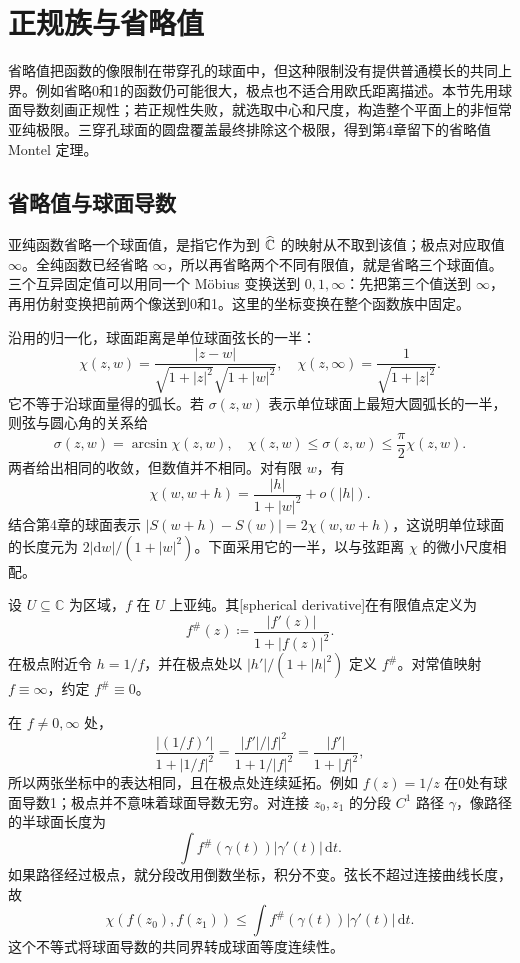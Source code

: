 \section{正规族与省略值}
\label{b3:sec:1403}

省略值把函数的像限制在带穿孔的球面中，但这种限制没有提供普通模长的共同上界。例如省略0和1的函数仍可能很大，极点也不适合用欧氏距离描述。本节先用球面导数刻画正规性；若正规性失败，就选取中心和尺度，构造整个平面上的非恒常亚纯极限。三穿孔球面的圆盘覆盖最终排除这个极限，得到第4章留下的省略值 Montel 定理。

\subsection{省略值与球面导数}
\label{b3:subsec:140301}

亚纯函数省略一个球面值，是指它作为到 \(\widehat{\mathbb C\kern0pt}\) 的映射从不取到该值；极点对应取值 \(\infty\)。全纯函数已经省略 \(\infty\)，所以再省略两个不同有限值，就是省略三个球面值。三个互异固定值可以用同一个 Möbius 变换送到 \(0,1,\infty\)：先把第三个值送到 \(\infty\)，再用仿射变换把前两个像送到0和1。这里的坐标变换在整个函数族中固定。

\ProseParagraphBreak
沿用的归一化，球面距离是单位球面弦长的一半：
\[
 \chi(z,w)=\frac{|z-w|}
 {\sqrt{1+|z|^2}\sqrt{1+|w|^2}},\quad
 \chi(z,\infty)=\frac1{\sqrt{1+|z|^2}}.
\]
它不等于沿球面量得的弧长。若 \(\sigma(z,w)\) 表示单位球面上最短大圆弧长的一半，则弦与圆心角的关系给
\[
 \sigma(z,w)=\arcsin\chi(z,w),\quad
 \chi(z,w)\le\sigma(z,w)\le\frac\pi2\chi(z,w).
\]
两者给出相同的收敛，但数值并不相同。对有限 \(w\)，有
\[
 \chi(w,w+h)=\frac{|h|}{1+|w|^2}+o(|h|).
\]
结合第4章的球面表示 \(|S(w+h)-S(w)|=2\chi(w,w+h)\)，这说明单位球面的长度元为 \(2|\mathrm dw|/(1+|w|^2)\)。下面采用它的一半，以与弦距离 \(\chi\) 的微小尺度相配。

\begin{definition}\label{b3:def:14-spherical-derivative}
设 \(U\subseteq\mathbb C\) 为区域，\(f\) 在 \(U\) 上亚纯。其[spherical derivative]在有限值点定义为
\[
 f^\#(z)\coloneqq\frac{|f'(z)|}{1+|f(z)|^2}.
\]
在极点附近令 \(h=1/f\)，并在极点处以 \(|h'|/(1+|h|^2)\) 定义 \(f^\#\)。对常值映射 \(f\equiv\infty\)，约定 \(f^\#\equiv0\)。
\end{definition}

在 \(f\ne0,\infty\) 处，
\[
 \frac{|(1/f)'|}{1+|1/f|^2}
 =\frac{|f'|/|f|^2}{1+1/|f|^2}
 =\frac{|f'|}{1+|f|^2},
\]
所以两张坐标中的表达相同，且在极点处连续延拓。例如 \(f(z)=1/z\) 在0处有球面导数1；极点并不意味着球面导数无穷。对连接 \(z_0,z_1\) 的分段 \(C^1\) 路径 \(\gamma\)，像路径的半球面长度为
\[
 \int f^\#(\gamma(t))|\gamma'(t)|\,\mathrm dt.
\]
如果路径经过极点，就分段改用倒数坐标，积分不变。弦长不超过连接曲线长度，故
\[
 \chi(f(z_0),f(z_1))
 \le\int f^\#(\gamma(t))|\gamma'(t)|\,\mathrm dt.
\]
这个不等式将球面导数的共同界转成球面等度连续性。

